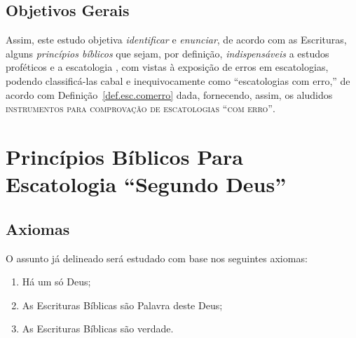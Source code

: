     \subsection{Objetivos Gerais}

    Assim, este estudo objetiva \emph{identificar} e \emph{enunciar}, de  acordo  com  as  Escrituras,  alguns  \emph{princípios
    bíblicos} que sejam, por definição, \emph{indispensáveis} a estudos proféticos e a escatologia  ,  com
    vistas à exposição de erros em escatologias, podendo classificá-las cabal e inequivocamente como ``escatologias com  erro,''
    de acordo com Definição~\ref{def.esc.comerro} dada, fornecendo, assim, os aludidos \textsc{instrumentos para comprovação  de
    escatologias ``com erro''}.




\section{Princípios Bíblicos Para Escatologia ``Segundo Deus''}

    \subsection{Axiomas}

    O assunto já delineado será estudado com base nos seguintes axiomas:

    \begin{enumerate}

        \item\label{ax:Deus.exis} Há um só Deus;

        \item\label{ax:Escr.pala} As Escrituras Bíblicas são Palavra deste Deus;

        \item\label{ax:Deus.verd} As Escrituras Bíblicas são verdade.

    \end{enumerate}

